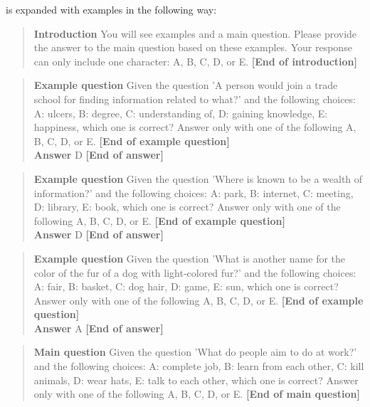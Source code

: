 \documentclass[fleqn,moreauthors,10pt]{ds_report}
\begin{document}
    is expanded with examples in the following way:
    
    \begin{quote}
        \textbf{Introduction} You will see examples and a main question. Please provide the answer to the main question based on these examples. Your response can only include one character: A, B, C, D, or E. \textbf{[End of introduction]}
    \end{quote}
    
    \begin{quote}
        \textbf{Example question} Given the question 'A person would join a trade school for finding information related to what?' and the following choices: A: ulcers, B: degree, C: understanding of, D: gaining knowledge, E: happiness, which one is correct? Answer only with one of the following A, B, C, D, or E. \textbf{[End of example question]} \\
        \textbf{Answer} D \textbf{[End of answer]}
    \end{quote}
    
    \begin{quote}
        \textbf{Example question} Given the question 'Where is known to be a wealth of information?' and the following choices: A: park, B: internet, C: meeting, D: library, E: book, which one is correct? Answer only with one of the following A, B, C, D, or E. \textbf{[End of example question]} \\
        \textbf{Answer} D \textbf{[End of answer]}
    \end{quote}
    
    \begin{quote}
        \textbf{Example question} Given the question 'What is another name for the color of the fur of a dog with light-colored fur?' and the following choices: A: fair, B: basket, C: dog hair, D: game, E: sun, which one is correct? Answer only with one of the following A, B, C, D, or E. \textbf{[End of example question]} \\
        \textbf{Answer} A \textbf{[End of answer]}
    \end{quote}
    
    \begin{quote}
        \textbf{Main question} Given the question 'What do people aim to do at work?' and the following choices: A: complete job, B: learn from each other, C: kill animals, D: wear hats, E: talk to each other, which one is correct? Answer only with one of the following A, B, C, D, or E. \textbf{[End of main question]}
    \end{quote}
\end{document}
